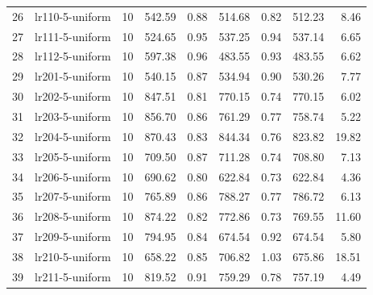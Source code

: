 \begin{tabular}{llrrrrrrr}
26 &   lr110-5-uniform &         10 &             542.59 &           0.88 &             514.68 &           0.82 &                512.23 &       8.46 \\
27 &   lr111-5-uniform &         10 &             524.65 &           0.95 &             537.25 &           0.94 &                537.14 &       6.65 \\
28 &   lr112-5-uniform &         10 &             597.38 &           0.96 &             483.55 &           0.93 &                483.55 &       6.62 \\
29 &   lr201-5-uniform &         10 &             540.15 &           0.87 &             534.94 &           0.90 &                530.26 &       7.77 \\
30 &   lr202-5-uniform &         10 &             847.51 &           0.81 &             770.15 &           0.74 &                770.15 &       6.02 \\
31 &   lr203-5-uniform &         10 &             856.70 &           0.86 &             761.29 &           0.77 &                758.74 &       5.22 \\
32 &   lr204-5-uniform &         10 &             870.43 &           0.83 &             844.34 &           0.76 &                823.82 &      19.82 \\
33 &   lr205-5-uniform &         10 &             709.50 &           0.87 &             711.28 &           0.74 &                708.80 &       7.13 \\
34 &   lr206-5-uniform &         10 &             690.62 &           0.80 &             622.84 &           0.73 &                622.84 &       4.36 \\
35 &   lr207-5-uniform &         10 &             765.89 &           0.86 &             788.27 &           0.77 &                786.72 &       6.13 \\
36 &   lr208-5-uniform &         10 &             874.22 &           0.82 &             772.86 &           0.73 &                769.55 &      11.60 \\
37 &   lr209-5-uniform &         10 &             794.95 &           0.84 &             674.54 &           0.92 &                674.54 &       5.80 \\
38 &   lr210-5-uniform &         10 &             658.22 &           0.85 &             706.82 &           1.03 &                675.86 &      18.51 \\
39 &   lr211-5-uniform &         10 &             819.52 &           0.91 &             759.29 &           0.78 &                757.19 &       4.49 \\

\end{tabular}
